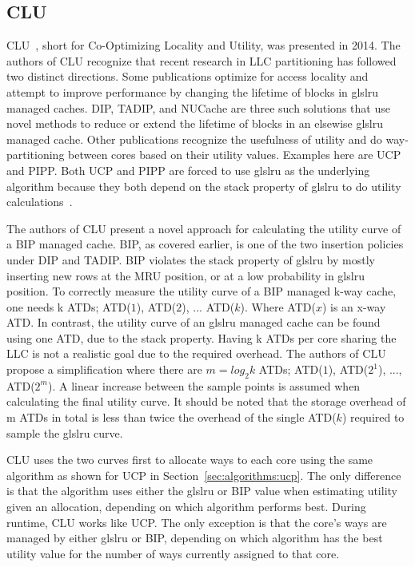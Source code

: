 
\subsection{CLU}
\label{sec:algorithms:clu}

CLU~\cite{Zhan2014}, short for Co-Optimizing Locality and Utility, was presented in 2014.
The authors of CLU recognize that recent research in LLC partitioning has followed two distinct directions.
Some publications optimize for access locality and attempt to improve performance by changing the lifetime of blocks in gls{lru} managed caches.
DIP, TADIP, and NUCache are three such solutions that use novel methods to reduce or extend the lifetime of blocks in an elsewise gls{lru} managed cache.
Other publications recognize the usefulness of utility and do way-partitioning between cores based on their utility values.
Examples here are UCP and PIPP.
Both UCP and PIPP are forced to use gls{lru} as the underlying algorithm because they both depend on the stack property of gls{lru} to do utility calculations~\cite{Qureshi2006, Xie2009}.

The authors of CLU present a novel approach for calculating the utility curve of a BIP managed cache.
BIP, as covered earlier, is one of the two insertion policies under DIP and TADIP. 
BIP violates the stack property of gls{lru} by mostly inserting new rows at the MRU position, or at a low probability in gls{lru} position.
To correctly measure the utility curve of a BIP managed k-way cache, one needs k ATDs; ATD($1$), ATD($2$), ... ATD($k$). 
Where ATD($x$) is an x-way ATD.
In contrast, the utility curve of an gls{lru} managed cache can be found using one ATD, due to the stack property.
Having k ATDs per core sharing the LLC is not a realistic goal due to the required overhead.
The authors of CLU propose a simplification where there are $m = log_2 k$ ATDs; ATD($1$), ATD($2^1$), ..., ATD($2^m$).
A linear increase between the sample points is assumed when calculating the final utility curve.
It should be noted that the storage overhead of m ATDs in total is less than twice the overhead of the single ATD($k$) required to sample the gls{lru} curve.

CLU uses the two curves first to allocate ways to each core using the same algorithm as shown for UCP in Section~\ref{sec:algorithms:ucp}.
The only difference is that the algorithm uses either the gls{lru} or BIP value when estimating utility given an allocation, depending on which algorithm performs best.
During runtime, CLU works like UCP.
The only exception is that the core's ways are managed by either gls{lru} or BIP, depending on which algorithm has the best utility value for the number of ways currently assigned to that core.


